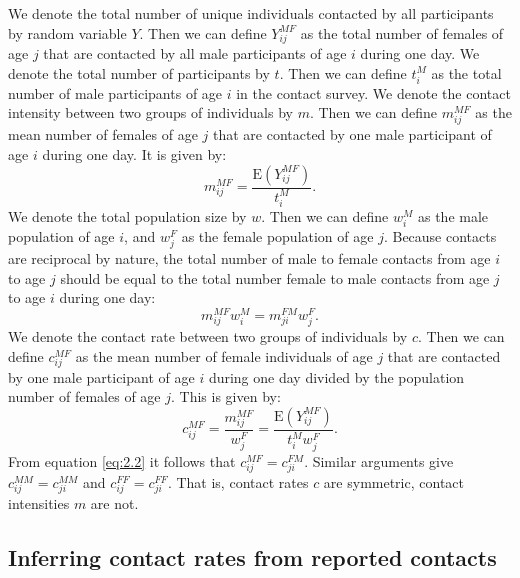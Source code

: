 \documentclass[aoas,preprint]{imsart}
\numberwithin{equation}{section}
\begin{document}
We denote the total number of unique individuals contacted by all participants by random variable $Y$. Then we can define $Y_{ij}^\mathit{MF}$ as the total number of females of age $j$ that are contacted by all male participants of age $i$ during one day. We denote the total number of participants by $t$. Then we can define $t_i^M$ as the total number of male participants of age $i$ in the contact survey. We denote the contact intensity between two groups of individuals by $m$. Then we can define $m_{ij}^\mathit{MF}$ as the mean number of females of age $j$ that are contacted by one male participant of age $i$ during one day. It is given by:
\begin{equation}\label{eq:2.1}
m_\mathit{ij}^\mathit{MF} = \frac{\text{E}(Y_\mathit{ij}^\mathit{MF})}{t_i^M}.
\end{equation}
We denote the total population size by $w$. Then we can define $w_i^M$ as the male population of age $i$, and $w_j^F$ as the female population of age $j$. Because contacts are reciprocal by nature, the total number of male to female contacts from age $i$ to age $j$ should be equal to the total number female to male contacts from age $j$ to age $i$ during one day:
\begin{equation}\label{eq:2.2}
m_\mathit{ij}^\mathit{MF}w_i^M = m_\mathit{ji}^\mathit{FM}w_j^F.
\end{equation}
We denote the contact rate between two groups of individuals by $c$. Then we can define $c_\mathit{ij}^\mathit{MF}$ as the mean number of female individuals of age $j$ that are contacted by one male participant of age $i$ during one day divided by the population number of females of age $j$. This is given by:
\begin{equation}\label{eq:2.3}
c_\mathit{ij}^\mathit{MF} = \frac{m_\mathit{ij}^\mathit{MF}}{w_j^F} = \frac{\text{E}(Y_\mathit{ij}^\mathit{MF})}{t_i^M w_j^F}.
\end{equation}
From equation \ref{eq:2.2} it follows that $c_\mathit{ij}^\mathit{MF} = c_\mathit{ji}^\mathit{FM}$. Similar arguments give $c_\mathit{ij}^\mathit{MM} = c_\mathit{ji}^\mathit{MM}$ and $c_\mathit{ij}^\mathit{FF} = c_\mathit{ji}^\mathit{FF}$. That is, contact rates $c$ are symmetric, contact intensities $m$ are not. 

\subsection{Inferring contact rates from reported contacts}
\end{document}
